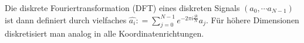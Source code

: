 Die diskrete Fouriertransformation (DFT) eines diskreten Signals $(a_0, \cdots a_{N-1})$ ist dann definiert durch vielfaches
$\hat{a_i} : = \sum_{j=0}^{N-1} e^{-2 \pi i \frac{jk}{N}} a_j$. 
Für höhere Dimensionen diskretisiert man analog in alle Koordinatenrichtungen. 

